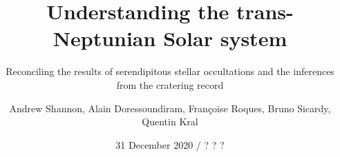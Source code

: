 \documentclass[printer]{aa}
\begin{document}
\title{Understanding the trans-Neptunian Solar system}
\subtitle{Reconciling the results of serendipitous stellar occultations and the inferences from the cratering record}
\author{Andrew Shannon, Alain Doressoundiram, Fran\c{c}oise Roques, Bruno Sicardy, Quentin Kral}




\date{31 December 2020 / ? ? ?}
\end{document}
